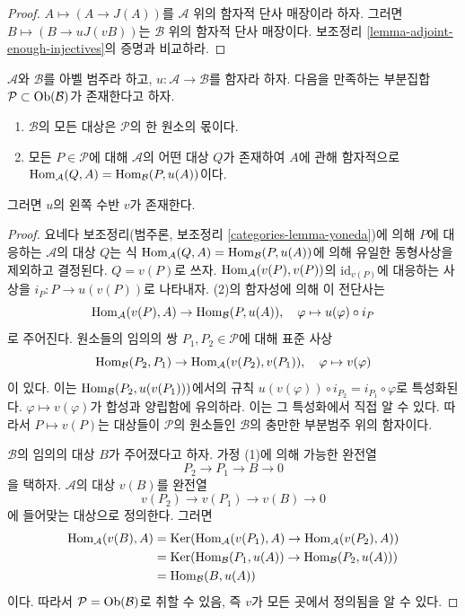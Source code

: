 \begin{proof}
$A \mapsto (A \to J(A))$를 $\mathcal{A}$ 위의 함자적 단사 매장이라
하자. 그러면 $B \mapsto (B \to uJ(vB))$는 $\mathcal{B}$ 위의 함자적
단사 매장이다. 보조정리 \ref{lemma-adjoint-enough-injectives}의 증명과
비교하라.
\end{proof}

\begin{lemma}
\label{lemma-partially-defined-adjoint}
$\mathcal{A}$와 $\mathcal{B}$를 아벨 범주라 하고,
$u : \mathcal{A} \to \mathcal{B}$를 함자라 하자. 다음을 만족하는
부분집합 $\mathcal{P} \subset \mathop{\mathrm{Ob}}\nolimits(\mathcal{B})$가 존재한다고 하자.
\begin{enumerate}
\item $\mathcal{B}$의 모든 대상은 $\mathcal{P}$의 한 원소의 몫이다.
\item 모든 $P \in \mathcal{P}$에 대해 $\mathcal{A}$의 어떤 대상 $Q$가
존재하여 $A$에 관해 함자적으로
$\mathop{\mathrm{Hom}}\nolimits_\mathcal{A}(Q, A) = \mathop{\mathrm{Hom}}\nolimits_\mathcal{B}(P, u(A))$이다.
\end{enumerate}
그러면 $u$의 왼쪽 수반 $v$가 존재한다.
\end{lemma}

\begin{proof}
요네다 보조정리(범주론, 보조정리 \ref{categories-lemma-yoneda})에 의해
$P$에 대응하는 $\mathcal{A}$의 대상 $Q$는 식
$\mathop{\mathrm{Hom}}\nolimits_\mathcal{A}(Q, A) = \mathop{\mathrm{Hom}}\nolimits_\mathcal{B}(P, u(A))$에 의해 유일한
동형사상을 제외하고 결정된다. $Q = v(P)$로 쓰자.
$\mathop{\mathrm{Hom}}\nolimits_\mathcal{A}(v(P), v(P))$의 $\text{id}_{v(P)}$에 대응하는 사상을
$i_P : P \to u(v(P))$로 나타내자.
(2)의 함자성에 의해 이 전단사는
$$
\mathop{\mathrm{Hom}}\nolimits_\mathcal{A}(v(P), A) \to \mathop{\mathrm{Hom}}\nolimits_\mathcal{B}(P, u(A)),\quad
\varphi \mapsto u(\varphi) \circ i_P
$$
로 주어진다. 원소들의 임의의 쌍 $P_1, P_2 \in \mathcal{P}$에 대해
표준 사상
$$
\mathop{\mathrm{Hom}}\nolimits_\mathcal{B}(P_2, P_1)
\to
\mathop{\mathrm{Hom}}\nolimits_\mathcal{A}(v(P_2), v(P_1)),\quad
\varphi \mapsto v(\varphi)
$$
이 있다. 이는 $\mathop{\mathrm{Hom}}\nolimits_\mathcal{B}(P_2, u(v(P_1)))$에서의 규칙
$u(v(\varphi)) \circ i_{P_2} = i_{P_1} \circ \varphi$로 특성화된다.
$\varphi \mapsto v(\varphi)$가 합성과 양립함에 유의하라. 이는 그
특성화에서 직접 알 수 있다. 따라서 $P \mapsto v(P)$는 대상들이
$\mathcal{P}$의 원소들인 $\mathcal{B}$의 충만한 부분범주 위의 함자이다.

\medskip\noindent
$\mathcal{B}$의 임의의 대상 $B$가 주어졌다고 하자. 가정 (1)에 의해
가능한 완전열
$$
P_2 \to P_1 \to B \to 0
$$
을 택하자. $\mathcal{A}$의 대상 $v(B)$를 완전열
$$
v(P_2) \to v(P_1) \to v(B) \to 0
$$
에 들어맞는 대상으로 정의한다. 그러면
\begin{align*}
\mathop{\mathrm{Hom}}\nolimits_\mathcal{A}(v(B), A)
& =
\mathop{\mathrm{Ker}}(\mathop{\mathrm{Hom}}\nolimits_\mathcal{A}(v(P_1), A) \to \mathop{\mathrm{Hom}}\nolimits_\mathcal{A}(v(P_2), A)) \\
& =
\mathop{\mathrm{Ker}}(\mathop{\mathrm{Hom}}\nolimits_\mathcal{B}(P_1, u(A)) \to \mathop{\mathrm{Hom}}\nolimits_\mathcal{B}(P_2, u(A))) \\
& =
\mathop{\mathrm{Hom}}\nolimits_\mathcal{B}(B, u(A))
\end{align*}
이다. 따라서 $\mathcal{P} = \mathop{\mathrm{Ob}}\nolimits(\mathcal{B})$로 취할 수 있음, 즉
$v$가 모든 곳에서 정의됨을 알 수 있다.
\end{proof}




